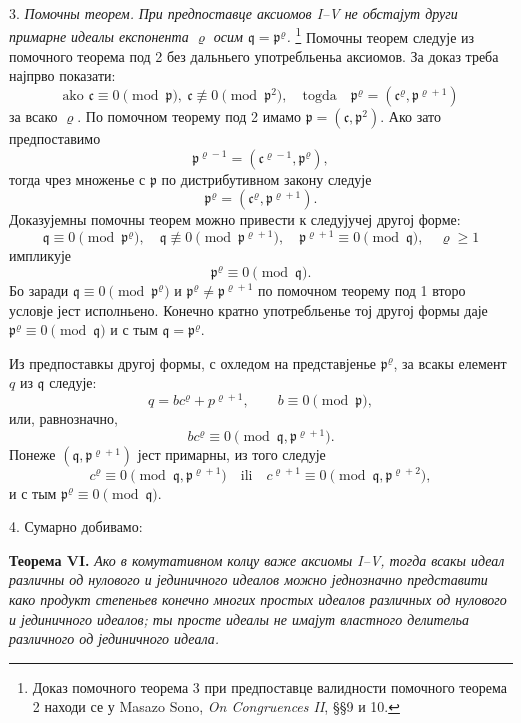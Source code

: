 \documentclass[11pt]{article}
\providecommand{\mc}{\mathfrak{c}}
\providecommand{\mq}{\mathfrak{q}}
\providecommand{\mpideal}{\mathfrak{p}}
\begin{document}
3. \emph{Помочны теорем.} \emph{При предпоставце аксиомов I--V не обстајут други примарне идеалы експонента $\varrho$ осим $\mq=\mpideal^\varrho$.}
\footnote{Доказ помочного теорема 3 при предпоставце валидности помочного теорема 2 находи се у Masazo Sono, \emph{On Congruences II}, §§9 и 10.}
Помочны теорем следује из помочного теорема под 2 без дальньего употребльеньа аксиомов. За доказ треба најпрво показати:
\[
        \text{ako }\mc\equiv0\pmod{\mpideal},\ \mc\not\equiv0\pmod{\mpideal^2},
        \quad\text{togda}\quad
        \mpideal^\varrho=(\mc^\varrho,\mpideal^{\varrho+1})
\]
за всако $\varrho$. По помочном теорему под 2 имамо $\mpideal=(\mc,\mpideal^2)$. Ако зато предпоставимо
\[
        \mpideal^{\varrho-1}=(\mc^{\varrho-1},\mpideal^\varrho),
\]
тогда чрез множенье с $\mpideal$ по дистрибутивном закону следује
\[
        \mpideal^\varrho=(\mc^\varrho,\mpideal^{\varrho+1}).
\]
Доказујемны помочны теорем можно привести к следујучеј другој форме:
\[
        \mq\equiv0\pmod{\mpideal^\varrho},
        \quad \mq\not\equiv0\pmod{\mpideal^{\varrho+1}},
        \quad \mpideal^{\varrho+1}\equiv0\pmod{\mq},
        \quad \varrho\ge1
\]
импликује
\[
        \mpideal^\varrho\equiv0\pmod{\mq}.
\]
Бо заради $\mq\equiv0\pmod{\mpideal^\varrho}$ и $\mpideal^\varrho\ne\mpideal^{\varrho+1}$ по помочном теорему под 1 второ условје јест исполньено. Конечно кратно употребльенье тој другој формы даје $\mpideal^\varrho\equiv0\pmod{\mq}$ и с тым $\mq=\mpideal^\varrho$.

Из предпоставкы другој формы, с охледом на представјенье $\mpideal^\varrho$, за всакы елемент $q$ из $\mq$ следује:
\[
        q=b c^\varrho+p^{\varrho+1},
        \qquad b\equiv0\pmod{\mpideal},
\]
или, равнозначно,
\[
        bc^\varrho\equiv0\pmod{\mq,\mpideal^{\varrho+1}}.
\]
Понеже $(\mq,\mpideal^{\varrho+1})$ јест примарны, из того следује
\[
        c^\varrho\equiv0\pmod{\mq,\mpideal^{\varrho+1}}
        \quad\text{ili}\quad
        c^{\varrho+1}\equiv0\pmod{\mq,\mpideal^{\varrho+2}},
\]
и с тым $\mpideal^\varrho\equiv0\pmod{\mq}$.

4. Сумарно добивамо:

\textbf{Теорема VI.} \emph{Ако в комутативном колцу важе аксиомы I--V, тогда всакы идеал различны од нулового и јединичного идеалов можно једнозначно представити како продукт степеньев конечно многих простых идеалов различных од нулового и јединичного идеалов; ты просте идеалы не имајут властного делительа различного од јединичного идеала.}
\end{document}
